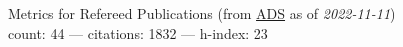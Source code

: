 Metrics for Refereed Publications (from \href{\adsurl}{ADS} as of \textit{2022-11-11}) \\count: 44 --- citations: 1832 --- h-index: 23